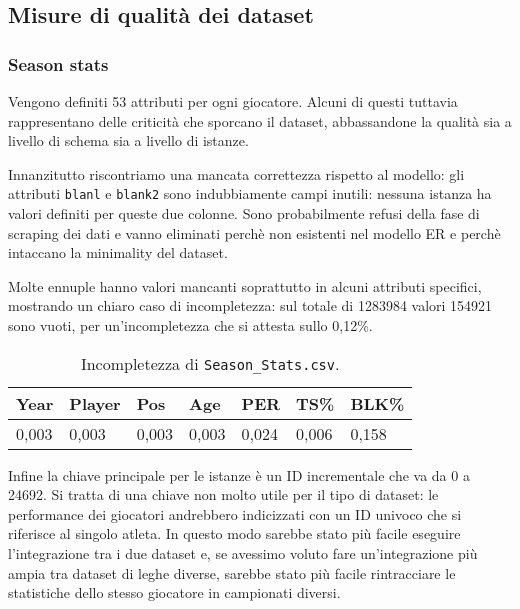 \subsection{Misure di qualità dei dataset}

\subsubsection{Season stats}

Vengono definiti 53 attributi per ogni giocatore. Alcuni di questi tuttavia rappresentano delle criticità che sporcano il dataset, abbassandone la qualità sia a livello di schema sia a livello di istanze.
\par
Innanzitutto riscontriamo una mancata correttezza rispetto al modello: gli attributi \texttt{blanl} e \texttt{blank2} sono indubbiamente campi inutili: nessuna istanza ha valori definiti per queste due colonne. Sono probabilmente refusi della fase di scraping dei dati e vanno eliminati perchè non esistenti nel modello ER e perchè intaccano la minimality del dataset.
\par
Molte ennuple hanno valori mancanti soprattutto in alcuni attributi specifici, mostrando un chiaro caso di incompletezza: sul totale di 1283984 valori 154921 sono vuoti, per un’incompletezza che si attesta sullo 0,12\%.

\begin{center}
	\begin{longtable}[m]{|m{3em} m{3em} m{3em} m{3em} m{3em} m{3em} m{3em}|} 

		\caption{Incompletezza di \texttt{Season\_Stats.csv}.\label{long}}\\
		\hline
		\bfseries{Year} & \bfseries{Player} & \bfseries{Pos} & \bfseries{Age} & \bfseries{PER} & \bfseries{TS\%} & \bfseries{BLK\%} \\ 
		\hline
		0,003 & 0,003 & 0,003 & 0,003 & 0,024 & 0,006 & 0,158 \\
		\hline
	\end{longtable}
\end{center}

Infine la chiave principale per le istanze è un ID incrementale che va da 0 a 24692. Si tratta di una chiave non molto utile per il tipo di dataset: le performance dei giocatori andrebbero indicizzati con un ID univoco che si riferisce al singolo atleta. In questo modo sarebbe stato più facile eseguire l’integrazione tra i due dataset e, se avessimo voluto fare un’integrazione più ampia tra dataset di leghe diverse, sarebbe stato più facile rintracciare le statistiche dello stesso giocatore in campionati diversi.

